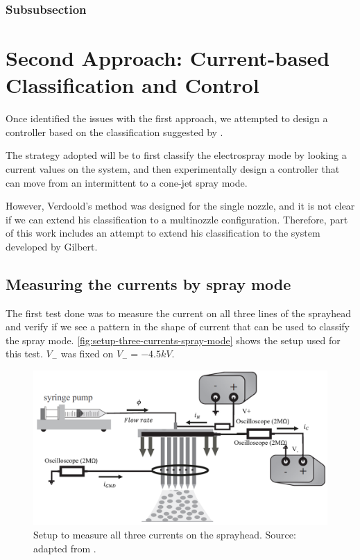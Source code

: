 \documentclass[oneside,12pt]{article}
\begin{document}
\subsubsection{Subsubsection}

\blindtext %

\section{Second Approach: Current-based Classification and Control} 

Once identified the issues with the first approach, we attempted to design a 
controller based on the classification suggested by \cite{Verdoold2013}.

The strategy adopted will be to first classify the electrospray mode by looking a current values 
on the system, and then experimentally design a controller that can move from an intermittent
to a cone-jet spray mode.

However, Verdoold's method was designed for the single nozzle, and it is not clear if we can 
extend his classification to a multinozzle configuration. Therefore, part of this work 
includes an attempt to extend his classification to the system developed by 
Gilbert.


\subsection{Measuring the currents by spray mode}

The first test done was to measure the current on all three lines of the sprayhead and 
verify if we see a pattern in the shape of current that can be used to classify the spray mode.
\autoref{fig:setup-three-currents-spray-mode} shows the setup used for this test. $V_-$ was fixed on 
$V_- = - 4.5 kV$.

\begin{figure}[h!]
    \centering
    \includegraphics[width=.8\textwidth,trim=1 1 1 1,clip]{figures/setup-three-currents-spray-mode.png}
    \caption{Setup to measure all three currents on the sprayhead. Source: adapted from \cite{Verdoold2013}.}
    \label{fig:setup-three-currents-spray-mode}
\end{figure}
\end{document}
